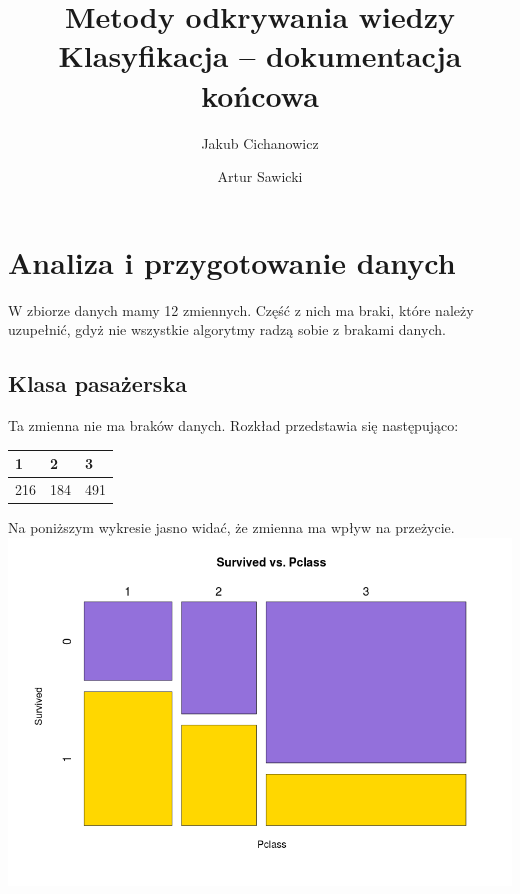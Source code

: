 \documentclass{article}
\begin{document}
\title{Metody odkrywania wiedzy \\%
{\large Klasyfikacja -- dokumentacja końcowa} }

\author{Jakub Cichanowicz \and Artur Sawicki}

\maketitle

\section{Analiza i przygotowanie danych}
W zbiorze danych mamy 12 zmiennych. Część z nich ma braki, które należy uzupełnić, gdyż nie wszystkie algorytmy radzą sobie z brakami danych.

\subsection{Klasa pasażerska}

Ta zmienna nie ma braków danych. Rozkład przedstawia się następująco:
\begin{center}
    \begin{tabular}{| l | l | l |}
    \hline
	1   & 2  & 3 \\ \hline
    216 & 184 & 491 \\
    \hline
    \end{tabular}
\end{center}

Na poniższym wykresie jasno widać, że zmienna ma wpływ na przeżycie.
\includegraphics[scale=0.40]{images/survived-vs-pclass.png}
\end{document}
